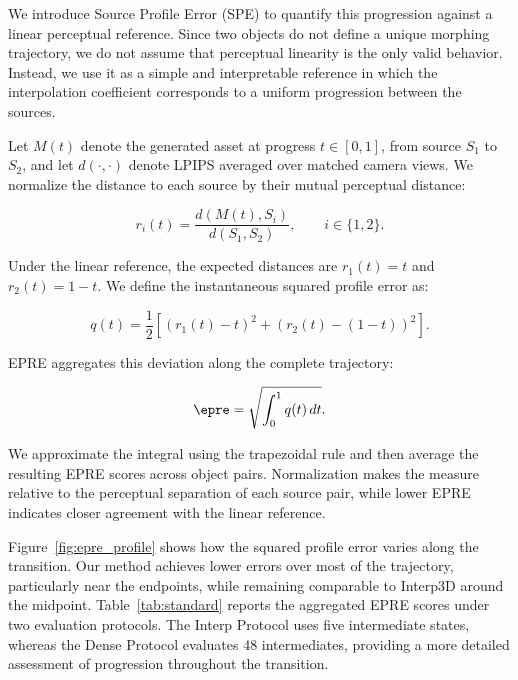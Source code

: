 We introduce Source Profile Error (SPE) to quantify this progression against a linear perceptual reference. Since two objects do not define a unique morphing trajectory, we do not assume that perceptual linearity is the only valid behavior. Instead, we use it as a simple and interpretable reference in which the interpolation coefficient corresponds to a uniform progression between the sources.

Let $M(t)$ denote the generated asset at progress $t\in[0,1]$, from source $S_1$ to $S_2$, and let $d(\cdot,\cdot)$ denote LPIPS averaged over matched camera views. We normalize the distance to each source by their mutual perceptual distance:

\begin{equation}
    r_i(t)=\frac{d(M(t),S_i)}{d(S_1,S_2)},
    \qquad i\in\{1,2\}.
\end{equation}

Under the linear reference, the expected distances are $r_1(t)=t$ and $r_2(t)=1-t$. We define the instantaneous squared profile error as:

\begin{equation}
    q(t)=\frac{1}{2}\left[
    (r_1(t)-t)^2+
    (r_2(t)-(1-t))^2
    \right].
    \label{eq:profile_error}
\end{equation}

EPRE aggregates this deviation along the complete trajectory:

\begin{equation}
    \epre=\sqrt{\int_0^1 q(t)\,dt}.
    \label{eq:epre}
\end{equation}

We approximate the integral using the trapezoidal rule and then average the resulting EPRE scores across object pairs. Normalization makes the measure relative to the perceptual separation of each source pair, while lower EPRE indicates closer agreement with the linear reference. 

Figure~\ref{fig:epre_profile} shows how the squared profile error varies along the transition. Our method achieves lower errors over most of the trajectory, particularly near the endpoints, while remaining comparable to Interp3D around the midpoint. Table~\ref{tab:standard} reports the aggregated EPRE scores under two evaluation protocols. The Interp Protocol uses five intermediate states, whereas the Dense Protocol evaluates 48 intermediates, providing a more detailed assessment of progression throughout the transition.